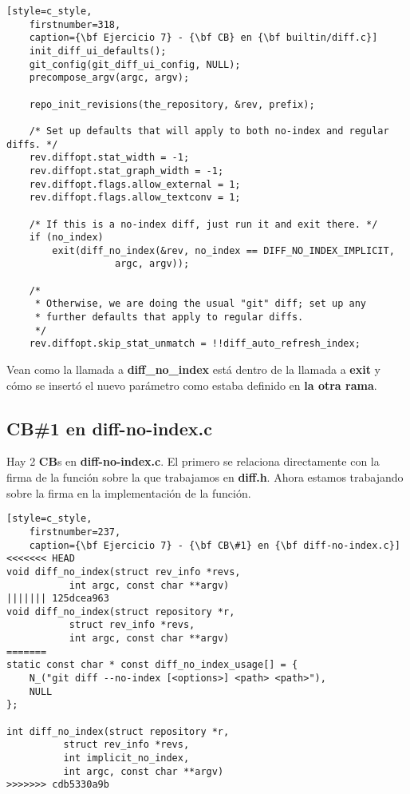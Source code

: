 \begin{lstlisting}[style=c_style,
	firstnumber=318,
	caption={\bf Ejercicio 7} - {\bf CB} en {\bf builtin/diff.c}]
	init_diff_ui_defaults();
	git_config(git_diff_ui_config, NULL);
	precompose_argv(argc, argv);

	repo_init_revisions(the_repository, &rev, prefix);

	/* Set up defaults that will apply to both no-index and regular diffs. */
	rev.diffopt.stat_width = -1;
	rev.diffopt.stat_graph_width = -1;
	rev.diffopt.flags.allow_external = 1;
	rev.diffopt.flags.allow_textconv = 1;

	/* If this is a no-index diff, just run it and exit there. */
	if (no_index)
		exit(diff_no_index(&rev, no_index == DIFF_NO_INDEX_IMPLICIT,
				   argc, argv));

	/*
	 * Otherwise, we are doing the usual "git" diff; set up any
	 * further defaults that apply to regular diffs.
	 */
	rev.diffopt.skip_stat_unmatch = !!diff_auto_refresh_index;
\end{lstlisting}

Vean como la llamada a {\bf diff\_no\_index} está dentro de la llamada a {\bf exit} y cómo se insertó
el nuevo parámetro como estaba definido en {\bf la otra rama}.

\subsection*{CB\#1 en diff-no-index.c}

Hay 2 {\bf CB}s en {\bf diff-no-index.c}. El primero se relaciona directamente con la firma de la función sobre la que trabajamos en
{\bf diff.h}. Ahora estamos trabajando sobre la firma en la implementación de la función.

\begin{lstlisting}[style=c_style,
	firstnumber=237,
	caption={\bf Ejercicio 7} - {\bf CB\#1} en {\bf diff-no-index.c}]
<<<<<<< HEAD
void diff_no_index(struct rev_info *revs,
		   int argc, const char **argv)
||||||| 125dcea963
void diff_no_index(struct repository *r,
		   struct rev_info *revs,
		   int argc, const char **argv)
=======
static const char * const diff_no_index_usage[] = {
	N_("git diff --no-index [<options>] <path> <path>"),
	NULL
};

int diff_no_index(struct repository *r,
		  struct rev_info *revs,
		  int implicit_no_index,
		  int argc, const char **argv)
>>>>>>> cdb5330a9b
\end{lstlisting}

